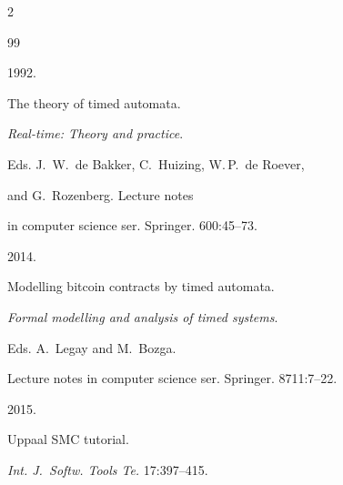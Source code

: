   \begin{multicols}{2}





\renewcommand{\bibname}{\protect\rmfamily References}







{\small\frenchspacing


 {%




 \begin{thebibliography}{99}




 1992.


The theory of timed automata.


\textit{Real-time: Theory and practice}.


Eds. J.~W.~de Bakker, C.~Huizing, W.\,P.~de Roever, 


 and G.~Rozenberg. Lecture notes


in  computer science ser.  Springer. 600:45--73.










 2014.


Modelling bitcoin contracts by timed automata.


\textit{Formal modelling and analysis of timed systems}.


Eds. A.~Legay and M.~Bozga. 


Lecture notes in computer science ser. Springer. 8711:7--22.












2015.


Uppaal SMC tutorial.


\textit{Int. J.~Softw. Tools Te.} 17:397--415.






\end{thebibliography}}}
\end{multicols}
